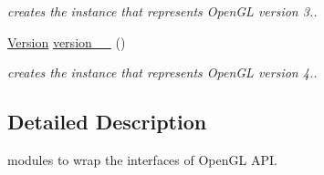 \begin{DoxyCompactItemize}
\begin{DoxyCompactList}\small\item\em creates the instance that represents Open\-G\-L version 3.. \end{DoxyCompactList}\item 
\hypertarget{namespacehryky_1_1opengl_a09e05bdbe6b5618bc752e8f9933722f0}{\hyperlink{classhryky_1_1opengl_1_1_version}{Version} \hyperlink{namespacehryky_1_1opengl_a09e05bdbe6b5618bc752e8f9933722f0}{version\-\_\-\_} ()}\label{namespacehryky_1_1opengl_a09e05bdbe6b5618bc752e8f9933722f0}

\begin{DoxyCompactList}\small\item\em creates the instance that represents Open\-G\-L version 4.. \end{DoxyCompactList}\end{DoxyCompactItemize}


\subsection{Detailed Description}
modules to wrap the interfaces of Open\-G\-L A\-P\-I. 